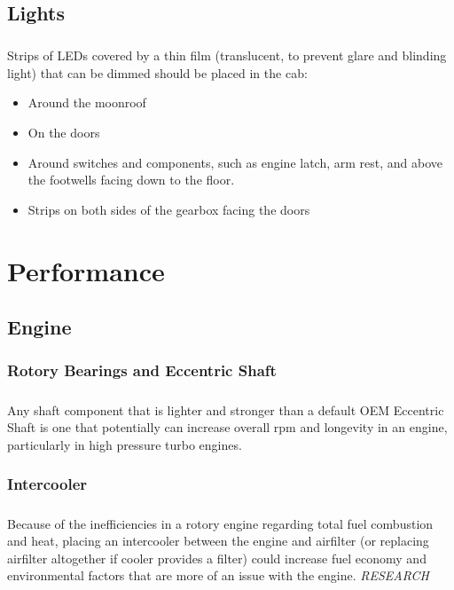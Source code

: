 \documentclass[a4paper,10pt]{report}
\begin{document}
\section{Lights}
\paragraph*{}Strips of LEDs covered by a thin film (translucent, to prevent glare and blinding light) that can be dimmed should be placed in the cab: 
\begin{itemize}
 \item Around the moonroof
 \item On the doors
 \item Around switches and components, such as engine latch, arm rest, and above the footwells facing down to the floor.
 \item Strips on both sides of the gearbox facing the doors
\end{itemize}


\chapter{Performance}
\section{Engine}
\subsection{Rotory Bearings and Eccentric Shaft} 
\paragraph*{}Any shaft component that is lighter and stronger than a default OEM Eccentric Shaft is one that potentially can increase overall rpm and longevity in an engine, particularly in high pressure turbo engines.
\subsection{Intercooler} 
\paragraph*{}Because of the inefficiencies in a rotory engine regarding total fuel combustion and heat, placing an intercooler between the engine and airfilter (or replacing airfilter altogether if cooler provides a filter) could increase fuel economy and environmental factors that are more of an issue with the engine. \textit{RESEARCH}
\end{document}

